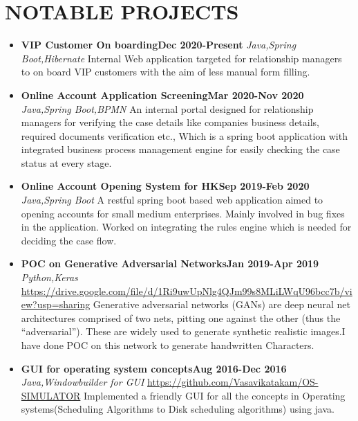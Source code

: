 \documentclass[12pt,a4paper,sans]{moderncv}        %
\begin{document}
\vspace{2pt}



\section{NOTABLE PROJECTS}

\vspace{5pt}

\begin{itemize}
\item{\textbf{VIP Customer On boarding}\hfill{\textbf{Dec 2020-Present}} 
\newline\textit{Java,Spring Boot,Hibernate}\newline
\small{Internal Web application targeted for relationship managers to on board VIP customers with the aim of  less manual form filling.}}
\vspace{3pt}
\item{\textbf{Online Account Application Screening}\hfill{\textbf{Mar 2020-Nov 2020}} 
\newline\textit{Java,Spring Boot,BPMN}\newline
\small{An internal portal designed for relationship managers for verifying the case details like companies business details, required documents verification etc., Which is a spring boot application with integrated business process management engine for easily checking the case status at every stage.}}
\vspace{1pt}
\item{\textbf{Online Account Opening System for HK}\hfill{\textbf{Sep 2019-Feb 2020}} 
\newline\textit{Java,Spring Boot}\newline
\small{A restful spring boot based web application aimed to opening accounts for small medium enterprises. Mainly involved in bug fixes in the application. Worked on integrating the rules engine which is needed for deciding the case flow.}}
\vspace{3pt}
\item{\textbf{POC on Generative Adversarial Networks}\hfill{\textbf{Jan 2019-Apr 2019}} 
\newline\textit{Python,Keras}\newline
{\color{blue}\url{https://drive.google.com/file/d/1Ri9uwUpNlg4QJm99s8MLiLWqU96bcc7b/view?usp=sharing}}
\small{Generative adversarial networks (GANs) are deep neural net architectures comprised of two nets,
pitting one against the other (thus the “adversarial”).
These are widely used to generate synthetic
realistic images.I have done POC on this network to generate handwritten Characters.}}
\vspace{3pt}
\item{\textbf{GUI for operating system concepts}\hfill{\textbf{Aug 2016-Dec 2016}} 
\newline\textit{Java,Windowbuilder for GUI}\newline
{\color{blue}\url{https://github.com/Vasavikatakam/OS-SIMULATOR}}
\newline
\small{Implemented a friendly GUI for all the concepts in Operating systems(Scheduling Algorithms to Disk scheduling algorithms) using java.}}


\end{itemize}
\end{document}
